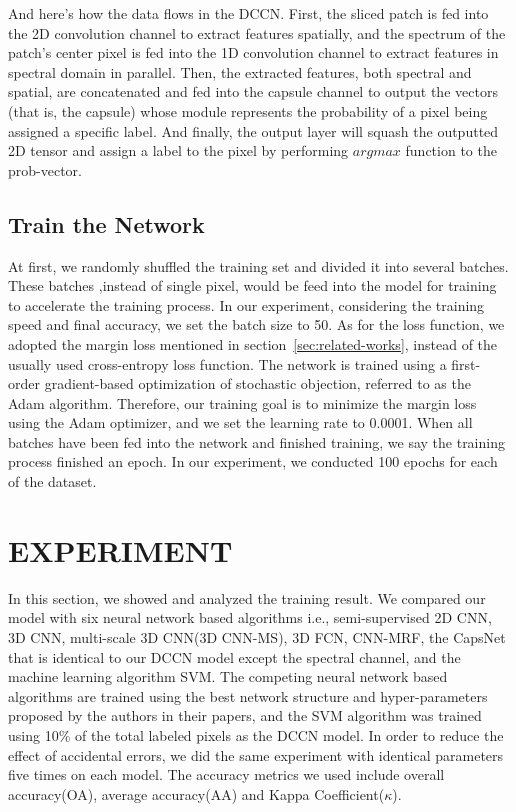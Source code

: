 \documentclass{article}
\begin{document}
	And here's how the data flows in the DCCN.
	First, the sliced patch is fed into the 2D convolution channel to extract features spatially, and the spectrum
	of the patch's center pixel is fed into the 1D convolution channel to extract features in spectral domain in
	parallel.
	Then, the extracted features, both spectral and spatial, are concatenated and fed into the capsule channel to output
	the vectors (that is, the capsule) whose module represents the probability of a pixel being assigned a specific
	label.
	And finally, the output layer will squash the outputted 2D tensor and assign a label to the pixel by performing
	$argmax$ function to the prob-vector.

	\subsection{Train the Network}\label{subsec:train-the-network}
	At first, we randomly shuffled the training set and divided it into several batches.
	These batches ,instead of single pixel, would be feed into the model for training to accelerate the training process.
	In our experiment, considering the training speed and final accuracy, we set the batch size to 50.
	As for the loss function, we adopted the margin loss mentioned in section~\ref{sec:related-works}, instead of the
	usually used cross-entropy loss function.
	The network is trained using a first-order gradient-based optimization of stochastic objection, referred to as the
	Adam algorithm.
	Therefore, our training goal is to minimize the margin loss using the Adam optimizer, and we set the learning rate
	to 0.0001.
	When all batches have been fed into the network and finished training, we say the training process finished an epoch.
	In our experiment, we conducted 100 epochs for each of the dataset.



	\section{EXPERIMENT}\label{sec:experiment}
	In this section, we showed and analyzed the training result.
	We compared our model with six neural network based algorithms i.e.,
	semi-supervised 2D CNN\cite{liu2017semi},
	3D CNN\cite{hamida20183},
	multi-scale 3D CNN(3D CNN-MS)\cite{he2017multi},
	3D FCN\cite{lee2016contextual},
	CNN-MRF\cite{cao2018hyperspectral},
	the CapsNet that is identical to our DCCN model except the spectral channel, and the machine learning algorithm
	SVM\@.
	The competing neural network based algorithms are trained using the best network structure and hyper-parameters
	proposed by the authors in their papers, and the SVM algorithm was trained using 10\% of the total labeled pixels
	as the DCCN model.
	In order to reduce the effect of accidental errors, we did the same experiment with identical parameters five times
	on each model.
	The accuracy metrics we used include overall accuracy(OA), average accuracy(AA) and Kappa Coefficient($\kappa$).
\end{document}
